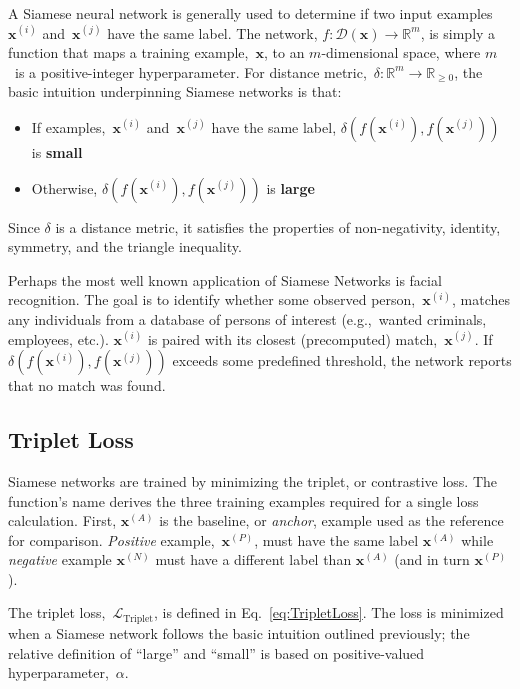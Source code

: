 \documentclass[10pt]{article}
\newcommand{\xI}[1]{\mathbf{x}^{(#1)}}
\newcommand{\xA}{\xI{i}}
\newcommand{\xB}{\xI{j}}
\newcommand{\puDist}[2]{\delta\left(#1, #2\right)}
\newcommand{\nnDist}[3]{\puDist{#1\left(#2\right)}{#1\left(#3\right)}}
\newcommand{\lTrip}{\mathcal{L}_{\text{Triplet}}}
\newcommand{\exA}{\xI{{A}}}
\newcommand{\exP}{\xI{{P}}}
\newcommand{\exN}{\xI{{N}}}
\begin{document}
  A Siamese neural network is generally used to determine if two input examples $\xA$ and~$\xB$ have the same label.  The network, $f: \mathcal{D}(\mathbf{x}) \rightarrow \mathbb{R}^{m}$, is simply a function that maps a training example,~$\mathbf{x}$, to an $m$-dimensional space, where $m$~is a positive-integer hyperparameter. For distance metric,~$\delta:\mathbb{R}^{m} \rightarrow \mathbb{R}_{{\geq}0}$, the basic intuition underpinning Siamese networks is that:

  \begin{itemize}
    \item If examples,~$\xA$ and~$\xB$ have the same label, $\nnDist{f}{\xA}{\xB}$ is \textbf{small}
    \item Otherwise, $\nnDist{f}{\xA}{\xB}$ is \textbf{large}
  \end{itemize}

  \noindent
  Since $\delta$ is a distance metric, it satisfies the properties of non-negativity, identity, symmetry, and the triangle inequality.

  Perhaps the most well known application of Siamese Networks is facial recognition.  The goal is to identify whether some observed person,~$\xI{i}$, matches any individuals from a database of persons of interest (e.g.,~wanted criminals, employees, etc.).  $\xI{i}$ is paired with its closest (precomputed) match,~$\xI{j}$.  If $\nnDist{f}{\xI{i}}{\xI{j}}$ exceeds some predefined threshold, the network reports that no match was found.

\subsection{Triplet Loss}\label{sec:TripletLoss}

  Siamese networks are trained by minimizing the triplet, or contrastive loss.  The function's name derives the three training examples required for a single loss calculation. First, $\exA$ is the baseline, or \textit{anchor}, example used as the reference for comparison.  \textit{Positive} example,~$\exP$, must have the same label $\exA$ while \textit{negative} example $\exN$ must have a different label than $\exA$ (and in turn $\exP$).

  The triplet loss,~$\lTrip$, is defined in Eq.~\eqref{eq:TripletLoss}. The loss is minimized when a Siamese network follows the basic intuition outlined previously; the relative definition of ``large'' and ``small'' is based on positive-valued hyperparameter,~$\alpha$.
\end{document}

